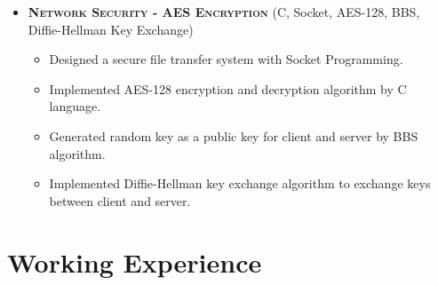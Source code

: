\documentclass[letterpaper,11pt]{article}
\begin{document}
\begin{itemize}
	\item [] \textbf{\textsc{Network Security - AES Encryption }} (C, Socket, AES-128, BBS, Diffie-Hellman Key Exchange)
	\setlength\itemsep{0em}
	\begin{itemize}[topsep=-1em]
	\setlength\itemindent{-0.25in}  %
	\setlength\itemsep{-0.1em} %
		\item [\textbullet]Designed a secure file transfer system with Socket Programming.
		\item [\textbullet]Implemented AES-128 encryption and decryption algorithm by C language.
		\item [\textbullet]Generated random key as a public key for client and server by BBS algorithm.
		\item [\textbullet] Implemented Diffie-Hellman key exchange algorithm to exchange keys between client and server.
	\end{itemize}
	
	

	
\end{itemize}





\section{Working Experience}
\end{document}
